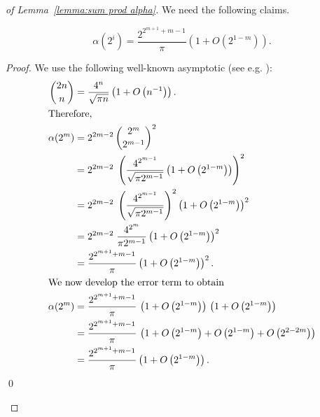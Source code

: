 \documentclass[a4paper,10pt]{llncs}
\begin{document}
\begin{proof}[of Lemma~\ref{lemma:sum prod alpha}]
We need the following claims.

\begin{claim}
\label{claim:inner:1}
$$
\alpha(2^i)
=
\frac{2^{2^{m+1} + m - 1}}{\pi}\left(1 + O\left(2^{1-m}\right)\right)
\text{.}
$$
\end{claim}
\begin{proof}
We use the following well-known asymptotic (see e.g. \cite{ConcreteMathematics:1994}):
\begin{align*}
\binom{2n}{n} &= 
\frac{4^n}{\sqrt{\pi n}} \left(1 + O\left(n^{-1}\right)\right)\text{.}
\\
\intertext{Therefore,}
\alpha(2^m)
&=
2^{2m-2} \, \binom{2^m}{2^{m-1}}^2
\\
&=
2^{2m-2}\;
\left(\frac{4^{2^{m-1}}}{\sqrt{\pi 2^{m-1}}} \left(1 + O\left(2^{1-m}\right)\right)\right)^2
\\
&=
2^{2m-2}\;
\left(\frac{4^{2^{m-1}}}{\sqrt{\pi 2^{m-1}}}\right)^2 \left(1 + O\left(2^{1-m}\right)\right)^2
\\
&=
2^{2m-2}\;
\frac{4^{2^m}}{\pi 2^{m-1}} \left(1 + O\left(2^{1-m}\right)\right)^2
\\
&=
\frac{2^{2^{m+1} + m - 1}}{\pi}\left(1 + O\left(2^{1-m}\right)\right)^2
\text{.}
\\
\intertext{We now develop the error term to obtain}
\alpha(2^m)
&=
\frac{2^{2^{m+1} + m - 1}}{\pi}\,
\left(1 + O\left(2^{1-m}\right)\right)
\,
\left(1 + O\left(2^{1-m}\right)\right)
\\
&=
\frac{2^{2^{m+1} + m - 1}}{\pi}\,
\left(
1 + O\left(2^{1-m}\right) + O\left(2^{1-m}\right) + O\left(2^{2-2m}\right)
\right)
\\
&=
\frac{2^{2^{m+1} + m - 1}}{\pi}\left(1 + O\left(2^{1-m}\right)\right)
\text{.}
\end{align*}
\qed
\end{proof}


\end{proof}
\end{document}
